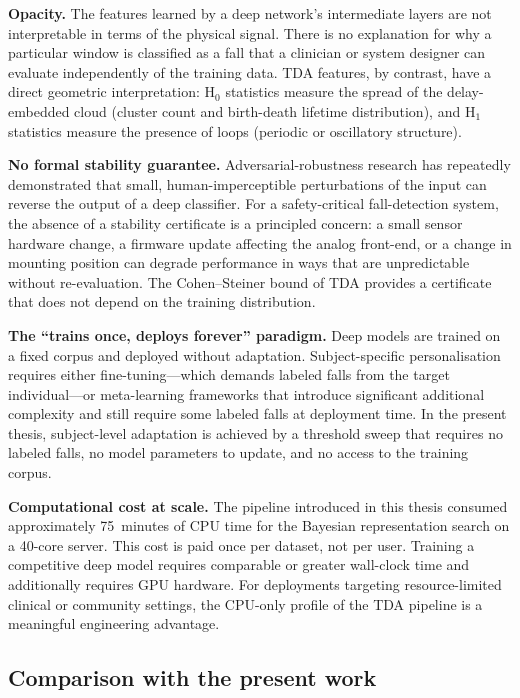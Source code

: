 \textbf{Opacity.}  The features learned by a deep network's intermediate layers are
not interpretable in terms of the physical signal.  There is no explanation for why
a particular window is classified as a fall that a clinician or system designer can
evaluate independently of the training data.  TDA features, by contrast, have a direct
geometric interpretation: H$_0$ statistics measure the spread of the delay-embedded
cloud (cluster count and birth-death lifetime distribution), and H$_1$ statistics
measure the presence of loops (periodic or oscillatory structure).

\textbf{No formal stability guarantee.}  Adversarial-robustness research has
repeatedly demonstrated that small, human-imperceptible perturbations of the input
can reverse the output of a deep classifier.  For a safety-critical fall-detection
system, the absence of a stability certificate is a principled concern: a small
sensor hardware change, a firmware update affecting the analog front-end, or a
change in mounting position can degrade performance in ways that are unpredictable
without re-evaluation.  The Cohen--Steiner bound of TDA provides a certificate that
does not depend on the training distribution.

\textbf{The ``trains once, deploys forever'' paradigm.}  Deep models are trained on
a fixed corpus and deployed without adaptation.  Subject-specific personalisation
requires either fine-tuning---which demands labeled falls from the target
individual---or meta-learning frameworks that introduce significant additional
complexity and still require some labeled falls at deployment time.  In the present
thesis, subject-level adaptation is achieved by a threshold sweep that requires no
labeled falls, no model parameters to update, and no access to the training corpus.

\textbf{Computational cost at scale.}  The pipeline introduced in this thesis
consumed approximately 75~minutes of CPU time for the Bayesian representation search
on a 40-core server.  This cost is paid once per dataset, not per user.
Training a competitive deep model requires comparable or greater wall-clock time
and additionally requires GPU hardware.  For deployments targeting resource-limited
clinical or community settings, the CPU-only profile of the TDA pipeline is a
meaningful engineering advantage.

\subsection{Comparison with the present work}

